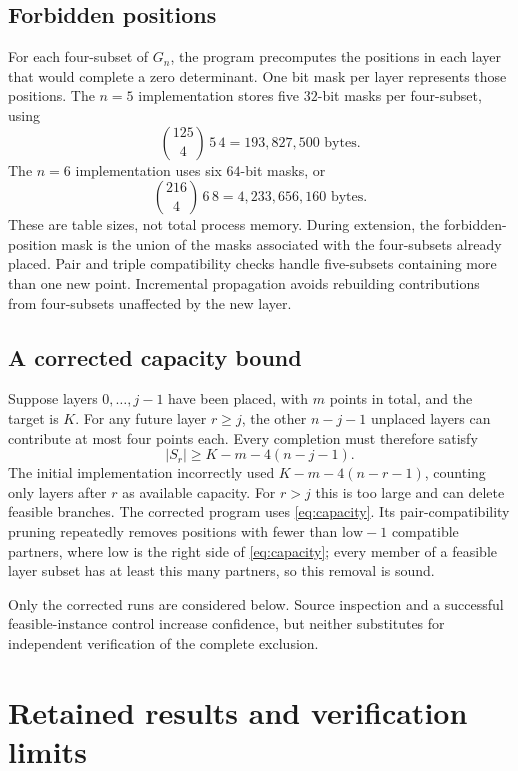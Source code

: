 \documentclass[11pt,a4paper]{article}
\begin{document}
\subsection{Forbidden positions}
For each four-subset of $G_n$, the program precomputes the positions in each layer that would complete a zero determinant. One bit mask per layer represents those positions. The $n=5$ implementation stores five $32$-bit masks per four-subset, using
\[
 \binom{125}{4}\,5\,4=193{,}827{,}500\text{ bytes}.
\]
The $n=6$ implementation uses six $64$-bit masks, or
\[
 \binom{216}{4}\,6\,8=4{,}233{,}656{,}160\text{ bytes}.
\]
These are table sizes, not total process memory. During extension, the forbidden-position mask is the union of the masks associated with the four-subsets already placed. Pair and triple compatibility checks handle five-subsets containing more than one new point. Incremental propagation avoids rebuilding contributions from four-subsets unaffected by the new layer.

\subsection{A corrected capacity bound}
Suppose layers $0,\ldots,j-1$ have been placed, with $m$ points in total, and the target is $K$. For any future layer $r\ge j$, the other $n-j-1$ unplaced layers can contribute at most four points each. Every completion must therefore satisfy
\begin{equation}\label{eq:capacity}
 |S_r|\ge K-m-4(n-j-1).
\end{equation}
The initial implementation incorrectly used $K-m-4(n-r-1)$, counting only layers after $r$ as available capacity. For $r>j$ this is too large and can delete feasible branches. The corrected program uses \eqref{eq:capacity}. Its pair-compatibility pruning repeatedly removes positions with fewer than $\mathrm{low}-1$ compatible partners, where $\mathrm{low}$ is the right side of \eqref{eq:capacity}; every member of a feasible layer subset has at least this many partners, so this removal is sound.

Only the corrected runs are considered below. Source inspection and a successful feasible-instance control increase confidence, but neither substitutes for independent verification of the complete exclusion.

\section{Retained results and verification limits}\label{sec:verification}
\end{document}
